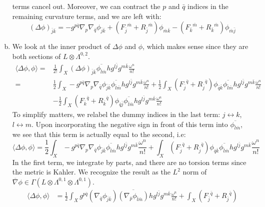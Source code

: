 \documentclass[12 pt]{article}
\theoremstyle{plain}
\theoremstyle{definition}
\theoremstyle{remark}
\begin{document}
\begin{enumerate}[(a)]
	terms cancel out. Moreover, we can contract the $p$ and $\bar q$ indices in the remaining curvature terms, and we are left with:
	\[	(\Delta \phi)_{\bar j \bar k} = - g^{p \bar q} \nabla_p \nabla_{\bar q} \phi_{\bar j \bar k} + ({F_{\bar j}}^{\bar m} + 
	{R_{\bar j}}^{\bar m}) \phi_{\bar m \bar k} - ({F_{\bar k}}^{\bar m} + {R_{\bar k}}^{\bar m}) \phi_{\bar m \bar j}	\]
\item We look at the inner product of $\Delta \phi$ and $\phi$, which makes sense since they are both sections of $L \otimes \Lambda^{0,2}$.
	\begin{align*}
	\langle \Delta \phi, \phi\rangle =& \frac{1}{2!} \int_X (\Delta \phi)_{\bar j \bar k} \overline{\phi_{\bar l \bar m}} h g^{l \bar j} g^{m \bar k}
	\frac{\omega^n}{n!} \\
	=&  \frac{1}{2} \int_X - g^{p \bar q} \nabla_p \nabla_{\bar q} \phi_{\bar j \bar k}  \overline{\phi_{\bar l \bar m}} h g^{l \bar j} 
	g^{m \bar k} \frac{\omega^n}{n!} + \frac{1}{2} \int_X ({F_{\bar j}}^{\bar q} + {R_{\bar j}}^{\bar q}) \phi_{\bar q \bar k}
	 \overline{\phi_{\bar l \bar m}} h g^{l \bar j} g^{m \bar k} \frac{\omega^n}{n!} \\
	&- \frac{1}{2} \int_X ({F_{\bar k}}^{\bar q} + {R_{\bar k}}^{\bar q}) \phi_{\bar q \bar j} \overline{\phi_{\bar l \bar m}} h g^{l \bar j} 
	g^{m \bar k} \frac{\omega^n}{n!}
	\end{align*}
	To simplify matters, we relabel the dummy indices in the last term: $j\leftrightarrow k$, $l \leftrightarrow m$. Upon incorporating the 
	negative sign in front of this term into $\overline {\phi_{\bar l \bar m}}$, we see that this term is actually equal to the second, i.e:
	\[	\langle \Delta \phi, \phi\rangle = \frac{1}{2} \int_X - g^{p \bar q} \nabla_p \nabla_{\bar q} \phi_{\bar j \bar k}  
	\overline{\phi_{\bar l \bar m}} h g^{l \bar j} g^{m \bar k} \frac{\omega^n}{n!} +  \int_X ({F_{\bar j}}^{\bar q} + 
	{R_{\bar j}}^{\bar q}) \phi_{\bar q \bar k} \overline{\phi_{\bar l \bar m}} h g^{l \bar j} g^{m \bar k} \frac{\omega^n}{n!}	\]
	In the first term, we integrate by parts, and there are no torsion terms since the metric is Kahler. We recognize the result as the
	$L^2$ norm of $\overline{\nabla} \phi \in \Gamma(L \otimes \Lambda^{0,1} \otimes \Lambda^{0,1})$.
	\begin{align*}
	\langle \Delta \phi, \phi\rangle &= \frac{1}{2} \int_X  g^{p \bar q} (\nabla_{\bar q} \phi_{\bar j \bar k} ) \overline{(\nabla_{\bar p} 
	\phi_{\bar l \bar m})} h g^{l \bar j} g^{m \bar k} \frac{\omega^n}{n!} +  \int_X ({F_{\bar j}}^{\bar q} + {R_{\bar j}}^{\bar q}) 

\end{align*}
\end{enumerate}
\end{document}
